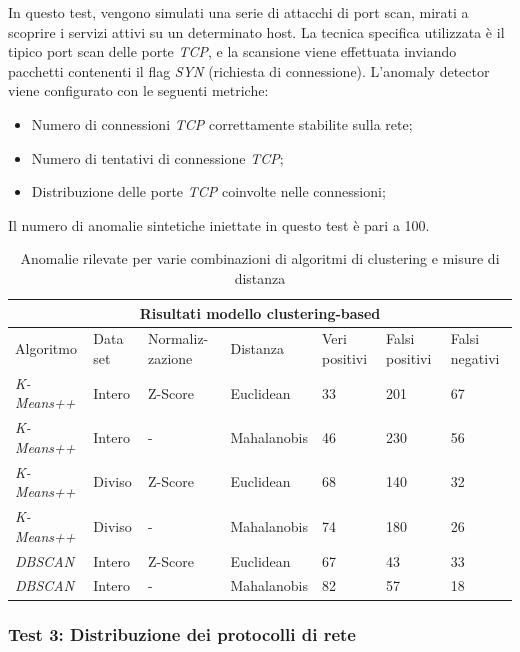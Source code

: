 \documentclass[12pt,a4paper,cucitura]{toptesi}
\begin{document}
In questo test, vengono simulati una serie di attacchi di port scan, mirati a scoprire i servizi attivi su un determinato host. La tecnica specifica utilizzata è il tipico port scan delle porte \emph{TCP}, e la scansione viene effettuata inviando pacchetti contenenti il flag \emph{SYN} (richiesta di connessione).
L'anomaly detector viene configurato con le seguenti metriche:

\begin{itemize}
\item Numero di connessioni \emph{TCP} correttamente stabilite sulla rete;
\item Numero di tentativi di connessione \emph{TCP};
\item Distribuzione delle porte \emph{TCP} coinvolte nelle connessioni;
\end{itemize}

Il numero di anomalie sintetiche iniettate in questo test è pari a 100.

\begin{center}
\begin{table}
\begin{tabular}{l|l|p{1.7cm}|l|p{1.5cm}|p{1.5cm}|p{1.5cm}}
\hline
\hline
\multicolumn{7}{c}{Risultati modello clustering-based} \\
\hline
Algoritmo & Data set & Normaliz- zazione & Distanza & Veri positivi & Falsi positivi & Falsi negativi \\
\hline
\emph{K-Means++} & Intero & Z-Score & Euclidean & 33 & 201 & 67 \\
\emph{K-Means++} & Intero & - & Mahalanobis & 46 & 230 & 56 \\
\emph{K-Means++} & Diviso & Z-Score & Euclidean & 68 & 140 & 32 \\
\emph{K-Means++} & Diviso & - & Mahalanobis & 74 & 180 & 26 \\
\emph{DBSCAN} & Intero & Z-Score & Euclidean & 67 & 43 & 33 \\
\emph{DBSCAN} & Intero & - & Mahalanobis & 82 & 57 & 18 \\
\hline
\hline
\end{tabular}
\caption[Port scan - anomalie rilevate]{Anomalie rilevate per varie combinazioni di algoritmi di clustering e misure di distanza}
\end{table}
\end{center}

\subsubsection{Test 3: Distribuzione dei protocolli di rete}
\end{document}
